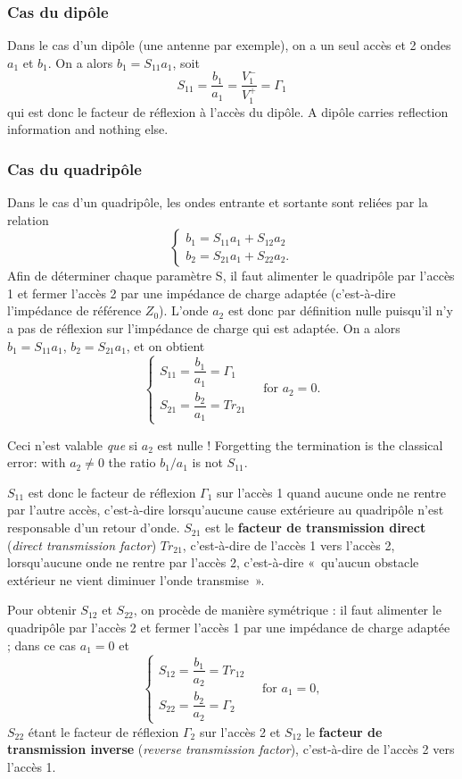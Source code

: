 \subsubsection{Cas du dipôle}
Dans le cas d'un dipôle (une antenne par exemple), on a un seul accès et 2 ondes $a_1$
et $b_1$. On a alors $b_1 = S_{11} a_1$, soit
\[\boxed{\;S_{11} = \frac{b_1}{a_1} = \frac{V_1^{-}}{V_1^{+}} = \Gamma_1\;}\]
qui est donc le facteur de réflexion à l'accès du dipôle. A dipôle carries reflection
information and nothing else.

\subsubsection{Cas du quadripôle}
Dans le cas d'un quadripôle, les ondes entrante et sortante sont reliées par la
relation
\[\begin{cases} b_1 = S_{11} a_1 + S_{12} a_2 \\ b_2 = S_{21} a_1 + S_{22} a_2. \end{cases}\]
Afin de déterminer chaque paramètre S, il faut alimenter le quadripôle par l'accès 1 et
fermer l'accès 2 par une impédance de charge adaptée (c'est-à-dire l'impédance de
référence $Z_0$). L'onde $a_2$ est donc par définition nulle puisqu'il n'y a pas de
réflexion sur l'impédance de charge qui est adaptée. On a alors $b_1 = S_{11} a_1$,
$b_2 = S_{21} a_1$, et on obtient
\[\boxed{\;
  \begin{cases}
    S_{11} = \dfrac{b_1}{a_1} = \Gamma_1 \\[2ex]
    S_{21} = \dfrac{b_2}{a_1} = Tr_{21}
  \end{cases}
  \quad \text{for } a_2 = 0.\;}\]

\begin{remark}
  Ceci n'est valable \emph{que} si $a_2$ est nulle ! Forgetting the termination is the
  classical error: with $a_2 \neq 0$ the ratio $b_1/a_1$ is not $S_{11}$.
\end{remark}

$S_{11}$ est donc le facteur de réflexion $\Gamma_1$ sur l'accès 1 quand aucune onde ne
rentre par l'autre accès, c'est-à-dire lorsqu'aucune cause extérieure au quadripôle
n'est responsable d'un retour d'onde. $S_{21}$ est le \textbf{facteur de transmission
direct} (\textit{direct transmission factor}) $Tr_{21}$, c'est-à-dire de l'accès 1 vers
l'accès 2, lorsqu'aucune onde ne rentre par l'accès 2, c'est-à-dire «~qu'aucun obstacle
extérieur ne vient diminuer l'onde transmise~».

Pour obtenir $S_{12}$ et $S_{22}$, on procède de manière symétrique : il faut alimenter
le quadripôle par l'accès 2 et fermer l'accès 1 par une impédance de charge adaptée ;
dans ce cas $a_1 = 0$ et
\[\boxed{\;
  \begin{cases}
    S_{12} = \dfrac{b_1}{a_2} = Tr_{12} \\[2ex]
    S_{22} = \dfrac{b_2}{a_2} = \Gamma_2
  \end{cases}
  \quad \text{for } a_1 = 0,\;}\]
$S_{22}$ étant le facteur de réflexion $\Gamma_2$ sur l'accès 2 et $S_{12}$ le
\textbf{facteur de transmission inverse} (\textit{reverse transmission factor}),
c'est-à-dire de l'accès 2 vers l'accès 1.

